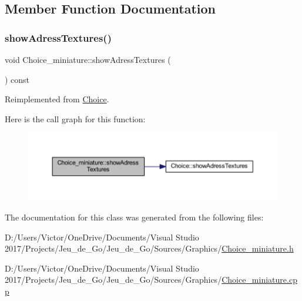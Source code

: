\subsection{Member Function Documentation}
\mbox{\label{class_choice__miniature_a6f413024d98b0c334c5a3e6ec87eba9b}} 
\subsubsection{\texorpdfstring{show\+Adress\+Textures()}{showAdressTextures()}}
{\footnotesize\ttfamily void Choice\+\_\+miniature\+::show\+Adress\+Textures (\begin{DoxyParamCaption}{ }\end{DoxyParamCaption}) const\hspace{0.3cm}{\ttfamily [virtual]}}



Reimplemented from \hyperlink{class_choice_ad29163ceee43a59dba6ea46452ca46c0}{Choice}.

Here is the call graph for this function\+:\nopagebreak
\begin{figure}[H]
\begin{center}
\leavevmode
\includegraphics[width=350pt]{class_choice__miniature_a6f413024d98b0c334c5a3e6ec87eba9b_cgraph}
\end{center}
\end{figure}


The documentation for this class was generated from the following files\+:\begin{DoxyCompactItemize}
\item 
D\+:/\+Users/\+Victor/\+One\+Drive/\+Documents/\+Visual Studio 2017/\+Projects/\+Jeu\+\_\+de\+\_\+\+Go/\+Jeu\+\_\+de\+\_\+\+Go/\+Sources/\+Graphics/\hyperlink{_choice__miniature_8h}{Choice\+\_\+miniature.\+h}\item 
D\+:/\+Users/\+Victor/\+One\+Drive/\+Documents/\+Visual Studio 2017/\+Projects/\+Jeu\+\_\+de\+\_\+\+Go/\+Jeu\+\_\+de\+\_\+\+Go/\+Sources/\+Graphics/\hyperlink{_choice__miniature_8cpp}{Choice\+\_\+miniature.\+cpp}\end{DoxyCompactItemize}
